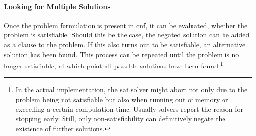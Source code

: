 	\paragraph{Looking for Multiple Solutions}
	Once the problem formulation is present in \gls{cnf}, it can be evaluated, whether the problem is satisfiable.
	Should this be the case, the negated solution can be added as a clause to the problem.
	If this also turns out to be satisfiable, an alternative solution has been found.
	This process can be repeated until the problem is no longer satisfiable, at which point all possible solutions have been found.\footnote{
		In the actual implementation, the \gls{sat} solver might abort not only due to the problem being not satisfiable but also when running out of memory or exceeding a certain computation time.
		Usually solvers report the reason for stopping early.
		Still, only non-satisfiability can definitively negate the existence of further solutions.
	}